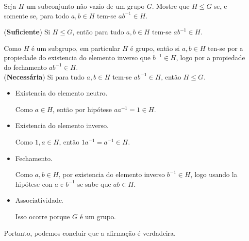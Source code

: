 \begin{homeworkProblem}
  Seja $H$ um subconjunto não vazio de um grupo $G$. Mostre que $H \le G$ se, e somente se, para todo $a,b \in H$ tem-se $ab^{-1} \in H$.
  \begin{solution}
    (\textbf{Suficiente}) Si $H\leq G$, então para tudo $a,b\in H$ tem-se $ab^{-1}\in H$.

    Como $H$ é um subgrupo, em particular $H$ é grupo, então si $a,b\in H$ ten-se por a propiedade do existencia do elemento inverso que $b^{-1}\in H$, logo por a propiedade do fechamento $ab^{-1}\in H$.\\

    (\textbf{Necessária}) Si para tudo $a,b\in H$ tem-se $ab^{-1}\in H$, então $H\leq G$.
    \begin{itemize}
      \item Existencia do elemento neutro.

        Como $a\in H$, então por hipótese $aa^{-1}=1\in H$.
      \item Existencia do elemento inverso.

        Como $1,a\in H$, então $1a^{-1}=a^{-1}\in H$.
      \item Fechamento.

        Como $a,b\in H$, por existencia do elemento inverso $b^{-1}\in H$, logo usando la hipótese con $a$ e $b^{-1}$ se sabe que $ab\in H$.
      \item Associatividade.

        Isso ocorre porque $G$ é um grupo.
    \end{itemize}
    Portanto, podemos concluir que a afirmação é verdadeira.
  \end{solution}
\end{homeworkProblem}
